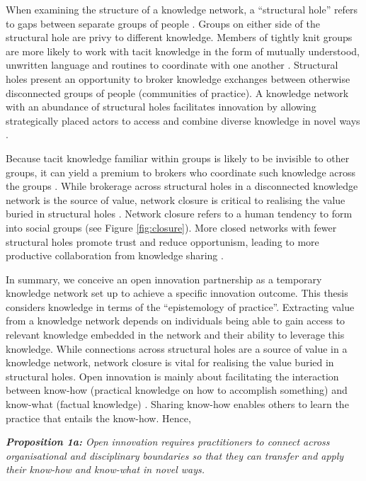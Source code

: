 When examining the structure of a knowledge network, a \enquote{structural hole} refers to gaps between separate groups of people \citep{burt2000network}. Groups on either side of the structural hole are privy to different knowledge. Members of tightly knit groups are more likely to work with tacit knowledge in the form of mutually understood, unwritten language and routines to coordinate with one another \citep{burt2007secondhand}. Structural holes present an opportunity to broker knowledge exchanges between otherwise disconnected groups of people (communities of practice). A knowledge network with an abundance of structural holes facilitates innovation by allowing strategically placed actors to access and combine diverse knowledge in novel ways \citep{burt2004structural,sparrowe2011publishing}. \medskip

Because tacit knowledge familiar within groups is likely to be invisible to other groups, it can yield a premium to brokers who coordinate such knowledge across the groups \citep{burt2007secondhand}. While brokerage across structural holes in a disconnected knowledge network is the source of value, network closure is critical to realising the value buried in structural holes \citep{burt2004structural,rost2011strength}. Network closure refers to a human tendency to form into social groups (see Figure \ref{fig:closure}). More closed networks with fewer structural holes promote trust and reduce opportunism, leading to more productive collaboration from knowledge sharing \citep{ahuja2000collaboration, burt2007secondhand}. \medskip

In summary, we conceive an open innovation partnership as a temporary knowledge network set up to achieve a specific innovation outcome. This thesis considers knowledge in terms of the \enquote{epistemology of practice}. Extracting value from a knowledge network depends on individuals being able to gain access to relevant knowledge embedded in the network and their ability to leverage this knowledge. While connections across structural holes are a source of value in a knowledge network, network closure is vital for realising the value buried in structural holes. Open innovation is mainly about facilitating the interaction between know-how (practical knowledge on how to accomplish something) and know-what (factual knowledge) \citep{winter1987knowledge,garud1997distinction}. Sharing know-how enables others to learn the practice that entails the know-how. Hence, \bigskip

\begin{tcolorbox}
\textit{\textbf{Proposition 1a:} Open innovation requires practitioners to connect across organisational and disciplinary boundaries so that they can transfer and apply their know-how and know-what in novel ways.}
\end{tcolorbox}

